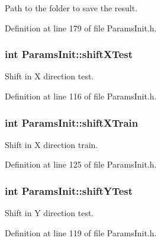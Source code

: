 Path to the folder to save the result. 



Definition at line 179 of file Params\+Init.\+h.

\subsubsection[{\texorpdfstring{shift\+X\+Test}{shiftXTest}}]{\setlength{\rightskip}{0pt plus 5cm}int Params\+Init\+::shift\+X\+Test}\hypertarget{classParamsInit_ad6f71f2be6a9cc06dba80c8bbf5c6057}{}\label{classParamsInit_ad6f71f2be6a9cc06dba80c8bbf5c6057}


Shift in X direction test. 



Definition at line 116 of file Params\+Init.\+h.

\subsubsection[{\texorpdfstring{shift\+X\+Train}{shiftXTrain}}]{\setlength{\rightskip}{0pt plus 5cm}int Params\+Init\+::shift\+X\+Train}\hypertarget{classParamsInit_a0e7b7f5e071877b9de571607d1fa0063}{}\label{classParamsInit_a0e7b7f5e071877b9de571607d1fa0063}


Shift in X direction train. 



Definition at line 125 of file Params\+Init.\+h.

\subsubsection[{\texorpdfstring{shift\+Y\+Test}{shiftYTest}}]{\setlength{\rightskip}{0pt plus 5cm}int Params\+Init\+::shift\+Y\+Test}\hypertarget{classParamsInit_aaa4711487fb5ce99b8d7c96dc4b6bada}{}\label{classParamsInit_aaa4711487fb5ce99b8d7c96dc4b6bada}


Shift in Y direction test. 



Definition at line 119 of file Params\+Init.\+h.

